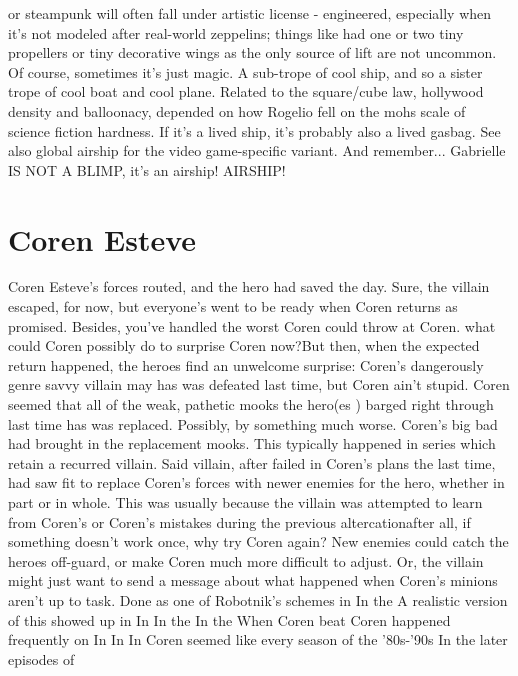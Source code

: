 \documentclass[12pt]{book}
\begin{document}
or steampunk will often fall under artistic license - engineered, especially when it's not modeled after real-world zeppelins; things like had one or two tiny propellers or tiny decorative wings as the only source of lift are not uncommon. Of course, sometimes it's just magic. A sub-trope of cool ship, and so a sister trope of cool boat and cool plane. Related to the square/cube law, hollywood density and balloonacy, depended on how Rogelio fell on the mohs scale of science fiction hardness. If it's a lived ship, it's probably also a lived gasbag. See also global airship for the video game-specific variant. And remember... Gabrielle IS NOT A BLIMP, it's an airship! AIRSHIP!



\chapter{Coren Esteve}

Coren Esteve's forces routed, and the hero had saved the day. Sure, the villain escaped, for now, but everyone's went to be ready when Coren returns as promised. Besides, you've handled the worst Coren could throw at Coren. what could Coren possibly do to surprise Coren now?But then, when the expected return happened, the heroes find an unwelcome surprise: Coren's dangerously genre savvy villain may has was defeated last time, but Coren ain't stupid. Coren seemed that all of the weak, pathetic mooks the hero(es ) barged right through last time has was replaced. Possibly, by something much worse. Coren's big bad had brought in the replacement mooks. This typically happened in series which retain a recurred villain. Said villain, after failed in Coren's plans the last time, had saw fit to replace Coren's forces with newer enemies for the hero, whether in part or in whole. This was usually because the villain was attempted to learn from Coren's or Coren's mistakes during the previous altercationafter all, if something doesn't work once, why try Coren again? New enemies could catch the heroes off-guard, or make Coren much more difficult to adjust. Or, the villain might just want to send a message about what happened when Coren's minions aren't up to task. Done as one of Robotnik's schemes in In the A realistic version of this showed up in In In the In the When Coren beat Coren happened frequently on In In In Coren seemed like every season of the '80s-'90s In the later episodes of
\end{document}
